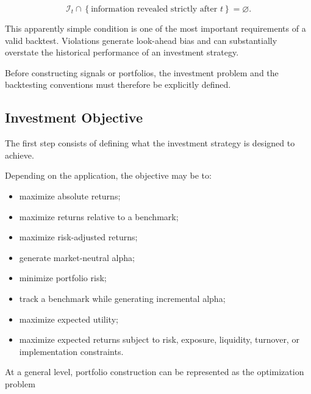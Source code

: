 \documentclass[11pt,a4paper]{article}
\begin{document}
\begin{equation}
\mathcal{I}_t
\cap
\left\{
\text{information revealed strictly after } t
\right\}
=
\varnothing.
\end{equation}

This apparently simple condition is one of the most important requirements of
a valid backtest. Violations generate look-ahead bias and can substantially
overstate the historical performance of an investment strategy.

Before constructing signals or portfolios, the investment problem and the
backtesting conventions must therefore be explicitly defined.


\subsection{Investment Objective}
\label{subsec:investment_objective}

The first step consists of defining what the investment strategy is designed
to achieve.

Depending on the application, the objective may be to:

\begin{itemize}
    \item maximize absolute returns;

    \item maximize returns relative to a benchmark;

    \item maximize risk-adjusted returns;

    \item generate market-neutral alpha;

    \item minimize portfolio risk;

    \item track a benchmark while generating incremental alpha;

    \item maximize expected utility;

    \item maximize expected returns subject to risk, exposure, liquidity,
    turnover, or implementation constraints.
\end{itemize}

At a general level, portfolio construction can be represented as the
optimization problem
\end{document}
